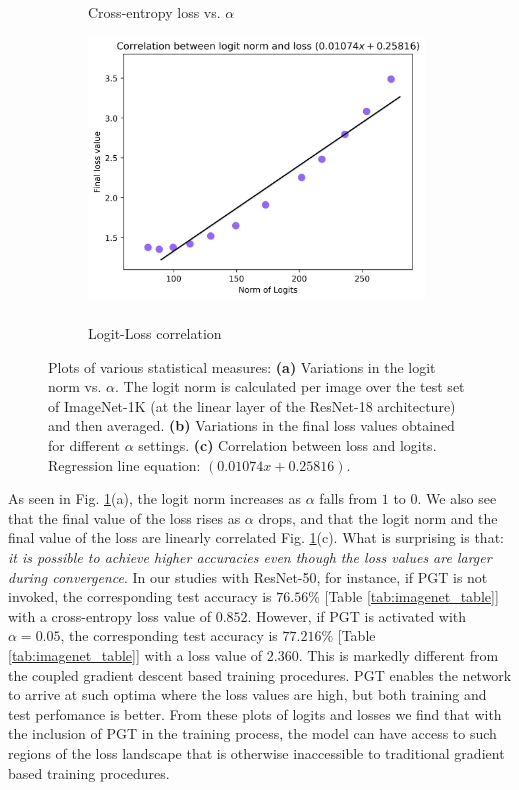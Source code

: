 \documentclass[runningheads]{llncs}
\begin{document}
\begin{figure}[!t]
\begin{subfigure}{0.33\textwidth}
\caption{\\Cross-entropy loss vs. $\alpha$}
\end{subfigure}%
\begin{subfigure}{0.33\textwidth}
\centering
\includegraphics[width=0.98\textwidth]{logit_vs_loss}
\caption{\\Logit-Loss correlation}
\end{subfigure}
\caption{ Plots of various statistical measures: \textbf{(a)} Variations in the logit
norm vs. $\alpha$. The logit norm is calculated per image over the test set of
ImageNet-1K (at the linear layer of the ResNet-18 architecture) and then averaged.
\textbf{(b)} Variations in the final loss values obtained for different $\alpha$
settings. \textbf{(c)} Correlation between loss and logits. Regression line equation:
$(0.01074 x + 0.25816)$. }
\label{fig:stats}
\vspace{-0.5cm}
\end{figure}





As seen in Fig. \ref{fig:stats}(a), the logit norm increases as $\alpha$ falls from $1$
to $0$. We also see that the final value of the loss rises as $\alpha$ drops, and that
the logit norm and the final value of the loss are linearly correlated Fig.
\ref{fig:stats}(c). What is surprising is that: \textit{it is possible to achieve higher
accuracies even though the loss values are larger during convergence}. In our studies
with ResNet-50, for instance, if PGT is not invoked, the corresponding test accuracy is
$76.56\%$ [Table \ref{tab:imagenet_table}] with a cross-entropy loss value of $0.852$.
However, if PGT is activated with $\alpha=0.05$, the corresponding test accuracy is
$77.216\%$ [Table \ref{tab:imagenet_table}] with a loss value of $2.360$. This is
markedly different from the coupled gradient descent based training procedures. PGT
enables the network to arrive at such optima where the loss values are high, but both
training and test perfomance is better. From these plots of logits and losses we find
that with the inclusion of PGT in the training process, the model can have access to
such regions of the loss landscape that is otherwise inaccessible to traditional
gradient based training procedures.
\end{document}
